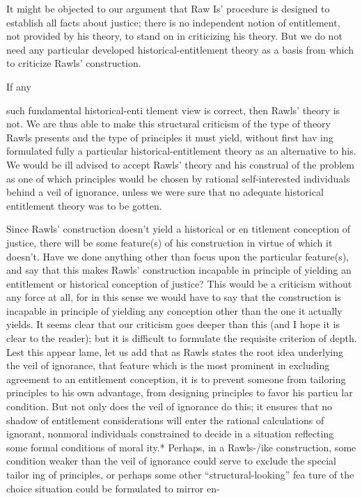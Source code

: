 \documentclass[11pt,openany]{book}
\begin{document}
It might be objected to our argument that Raw Is' procedure is designed to establish all facts about justice; there is no independent notion of entitlement, not provided by his theory, to stand on in criticizing his theory. But we do not need any particular developed historical-entitlement theory as a basis from which to criticize Rawls' construction. 

If any 

such fundamental historical-enti tlement view is correct, then Rawls' theory is not. We are thus able to make this structural criticism of the type of theory Rawls presents and the type of principles it must yield, without first hav ing formulated fully a particular historical-entitlement theory as an alternative to his. We would be ill advised to accept Rawls' theory and his construal of the problem as one of which principles would be chosen by rational self-interested individuals behind a veil of ignorance, unless we were sure that no adequate historical entitlement theory was to be gotten. 

Since Rawls' construction doesn't yield a historical or en titlement conception of justice, there will be some feature(s) of his construction in virtue of which it doesn't. Have we done anything other than focus upon the particular feature(s), and say that this makes Rawls' construction incapable in principle of yielding an entitlement or historical conception of justice? This would be a criticism without any force at all, for in this sense we would have to say that the construction is incapable in principle of yielding any conception other than the one it actually yields. It seems clear that our criticism goes deeper than this (and I hope it is clear to the reader); but it is difficult to formulate the requisite criterion of depth. Lest this appear lame, let us add that as Rawls states the root idea underlying the veil of ignorance, that feature which is the most prominent in excluding agreement to an entitlement conception, it is to prevent someone from tailoring principles to his own advantage, from designing principles to favor his particu lar condition. But not only does the veil of ignorance do this; it ensures that no shadow of entitlement considerations will enter the rational calculations of ignorant, nonmoral individuals constrained to decide in a situation reflecting some formal conditions of moral ity.* Perhaps, in a Rawls-/ike construction, some condition weaker than the veil of ignorance could serve to exclude the special tailor ing of principles, or perhaps some other ``structural-looking'' fea ture of the choice situation could be formulated to mirror en-
\end{document}
